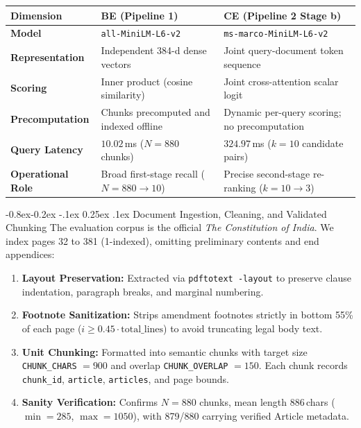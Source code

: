 \documentclass[11pt,a4paper]{article}
\makeatletter
\providecommand{\toprule}{\hline\hline}
\providecommand{\midrule}{\hline}
\providecommand{\bottomrule}{\hline\hline}
\newcommand{\captionof}[2]{%
  \def\@captype{#1}%
  \caption{#2}%
}
\renewcommand\subsection{\@startsection{subsection}{2}{\z@}%
  {-0.8ex\@plus -0.2ex \@minus -.1ex}%
  {0.25ex \@plus .1ex}%
  {\normalfont\normalsize\bfseries\color{primaryblue}}}
\newenvironment{tightcenter}{%
  \setlength\topsep{1.2pt}%
  \setlength\parskip{0pt}%
  \begin{center}%
}{%
  \end{center}%
}
\makeatother
\begin{document}
\begin{tightcenter}
\small
\renewcommand{\arraystretch}{0.84}
\begin{tabularx}{\textwidth}{l p{5.5cm} X}
\toprule
\textbf{Dimension} & \textbf{BE (Pipeline 1)} & \textbf{CE (Pipeline 2 Stage b)} \\
\midrule
\textbf{Model} & \texttt{all-MiniLM-L6-v2} & \texttt{ms-marco-MiniLM-L6-v2} \\
\textbf{Representation} & Independent 384-d dense vectors & Joint query-document token sequence \\
\textbf{Scoring} & Inner product (cosine similarity) & Joint cross-attention scalar logit \\
\textbf{Precomputation} & Chunks precomputed and indexed offline & Dynamic per-query scoring; no precomputation \\
\textbf{Query Latency} & $10.02$\,ms ($N = 880$ chunks) & $324.97$\,ms ($k = 10$ candidate pairs) \\
\textbf{Operational Role} & Broad first-stage recall ($N = 880 \rightarrow 10$) & Precise second-stage re-ranking ($k = 10 \rightarrow 3$) \\
\bottomrule
\end{tabularx}
\vspace{0.08em}
\captionof{table}{Operational comparison of BE and CE in the RAG pipeline.}
\label{tab:arch_comparison}
\end{tightcenter}

\subsection{Document Ingestion, Cleaning, and Validated Chunking}
The evaluation corpus is the official \textit{The Constitution of India}. We index pages 32 to 381 (1-indexed), omitting preliminary contents and end appendices:
\begin{enumerate}
  \setlength{\itemsep}{0pt}\setlength{\parskip}{0pt}\setlength{\parsep}{0pt}
  \item \textbf{Layout Preservation:} Extracted via \texttt{pdftotext -layout} to preserve clause indentation, paragraph breaks, and marginal numbering.
  \item \textbf{Footnote Sanitization:} Strips amendment footnotes strictly in bottom 55\% of each page ($i \ge 0.45 \cdot \text{total\_lines}$) to avoid truncating legal body text.
  \item \textbf{Unit Chunking:} Formatted into semantic chunks with target size \texttt{CHUNK\_CHARS} $= 900$ and overlap \texttt{CHUNK\_OVERLAP} $= 150$. Each chunk records \texttt{chunk\_id}, \texttt{article}, \texttt{articles}, and page bounds.
  \item \textbf{Sanity Verification:} Confirms $N = 880$ chunks, mean length $886$\,chars ($\min = 285$, $\max = 1050$), with 879/880 carrying verified Article metadata.
\end{enumerate}
\end{document}
